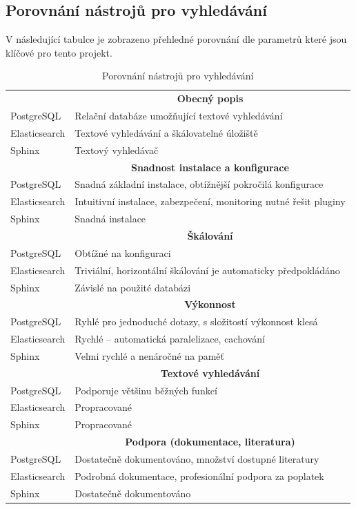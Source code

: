 \documentclass[FM,DP]{tulthesis}
\begin{document}
\subsection{Porovnání nástrojů pro vyhledávání}

V následující tabulce je zobrazeno přehledné porovnání dle parametrů které jsou klíčové pro 
tento projekt. 

\begin{table}[h!]
\captionsetup{singlelinecheck=false,justification=raggedright}
\caption{Porovnání nástrojů pro vyhledávání}
\label{search-comp}
\centering
\begin{tabular}{ll}  
\toprule
&\multicolumn{1}{c}{\textbf{Obecný popis}} \\
\cmidrule(r){2-2}
PostgreSQL    & Relační databáze umožňující textové vyhledávání \\
Elasticsearch & Textové vyhledávání a škálovatelné úložiště \\
Sphinx        & Textový vyhledávač \\
\midrule
\midrule
&\multicolumn{1}{c}{\textbf{Snadnost instalace a konfigurace}} \\
\cmidrule(r){2-2}
PostgreSQL    & Snadná základní instalace, obtížnější pokročilá konfigurace \\
Elasticsearch & Intuitivní instalace, zabezpečení, monitoring nutné řešit pluginy \\
Sphinx        & Snadná instalace \\
\midrule
\midrule
&\multicolumn{1}{c}{\textbf{Škálování}} \\
\cmidrule(r){2-2}
PostgreSQL    & Obtížné na konfiguraci \\
Elasticsearch & Triviální, horizontální škálování je automaticky předpokládáno \\
Sphinx        & Závislé na použité databázi \\
\midrule
\midrule
&\multicolumn{1}{c}{\textbf{Výkonnost}} \\
\cmidrule(r){2-2}
PostgreSQL    & Ryhlé pro jednoduché dotazy, s složitostí výkonnost klesá \\
Elasticsearch & Rychlé -- automatická paralelizace, cachování \\
Sphinx        & Velmi rychlé a nenáročné na paměť\\
\midrule
\midrule
&\multicolumn{1}{c}{\textbf{Textové vyhledávání}} \\
\cmidrule(r){2-2}
PostgreSQL    & Podporuje většinu běžných funkcí \\
Elasticsearch & Propracované \\
Sphinx        & Propracované \\
\midrule
\midrule
&\multicolumn{1}{c}{\textbf{Podpora (dokumentace, literatura)}} \\
\cmidrule(r){2-2}
PostgreSQL    & Dostatečně dokumentováno, množství dostupné literatury \\
Elasticsearch & Podrobná dokumentace, profesionální podpora za poplatek \\
Sphinx        & Dostatečně dokumentováno \\
\bottomrule
\end{tabular}
\end{table}
\end{document}
